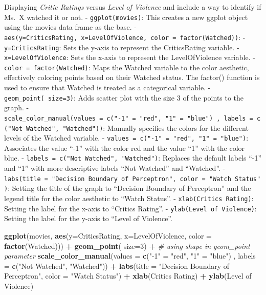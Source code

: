 \documentclass[
]{article}
\newenvironment{Shaded}{\begin{snugshade}}{\end{snugshade}}
\newcommand{\AttributeTok}[1]{\textcolor[rgb]{0.13,0.29,0.53}{#1}}
\newcommand{\CommentTok}[1]{\textcolor[rgb]{0.56,0.35,0.01}{\textit{#1}}}
\newcommand{\DecValTok}[1]{\textcolor[rgb]{0.00,0.00,0.81}{#1}}
\newcommand{\FunctionTok}[1]{\textcolor[rgb]{0.13,0.29,0.53}{\textbf{#1}}}
\newcommand{\NormalTok}[1]{#1}
\newcommand{\OtherTok}[1]{\textcolor[rgb]{0.56,0.35,0.01}{#1}}
\newcommand{\SpecialCharTok}[1]{\textcolor[rgb]{0.81,0.36,0.00}{\textbf{#1}}}
\newcommand{\StringTok}[1]{\textcolor[rgb]{0.31,0.60,0.02}{#1}}
\begin{document}
Displaying \emph{Critic Ratings} versus \emph{Level of Violence} and
include a way to identify if Ms.~X watched it or not. -
\texttt{ggplot(movies)}: This creates a new ggplot object using the
movies data frame as the base. -
\texttt{aes(y=CriticsRating,\ x=LevelOfViolence,\ color\ =\ factor(Watched))}:
- \texttt{y=CriticsRating}: Sets the y-axis to represent the
CriticsRating variable. - \texttt{x=LevelOfViolence}: Sets the x-axis to
represent the LevelOfViolence variable. -
\texttt{color\ =\ factor(Watched)}: Maps the Watched variable to the
color aesthetic, effectively coloring points based on their Watched
status. The factor() function is used to ensure that Watched is treated
as a categorical variable. - \texttt{geom\_point(\ size=3)}: Adds
scatter plot with the size 3 of the points to the graph. -
\texttt{scale\_color\_manual(values\ =\ c("-1"\ =\ "red",\ "1"\ =\ "blue")\ ,\ labels\ =\ c("Not\ Watched",\ "Watched"))}:
Manually specifies the colors for the different levels of the Watched
variable. - \texttt{values\ =\ c("-1"\ =\ "red",\ "1"\ =\ "blue")}:
Associates the value ``-1'' with the color red and the value ``1'' with
the color blue. - \texttt{labels\ =\ c("Not\ Watched",\ "Watched")}:
Replaces the default labels ``-1'' and ``1'' with more descriptive
labels ``Not Watched'' and ``Watched''. -
\texttt{labs(title\ =\ "Decision\ Boundary\ of\ Perceptron",\ color\ =\ "Watch\ Status")}:
Setting the title of the graph to ``Decision Boundary of Perceptron''
and the legend title for the color aesthetic to ``Watch Status''. -
\texttt{xlab(\textquotesingle{}Critics\ Rating\textquotesingle{})}:
Setting the label for the x-axis to ``Critics Rating''. -
\texttt{ylab(\textquotesingle{}Level\ of\ Violence\textquotesingle{})}:
Setting the label for the y-axis to ``Level of Violence''.

\begin{Shaded}
\begin{Highlighting}[]
\FunctionTok{ggplot}\NormalTok{(movies, }\FunctionTok{aes}\NormalTok{(}\AttributeTok{y=}\NormalTok{CriticsRating, }\AttributeTok{x=}\NormalTok{LevelOfViolence, }\AttributeTok{color =} \FunctionTok{factor}\NormalTok{(Watched))) }\SpecialCharTok{+}
  \FunctionTok{geom\_point}\NormalTok{( }\AttributeTok{size=}\DecValTok{3}\NormalTok{) }\SpecialCharTok{+} \CommentTok{\# using shape in geom\_point parameter}
  \FunctionTok{scale\_color\_manual}\NormalTok{(}\AttributeTok{values =} \FunctionTok{c}\NormalTok{(}\StringTok{"{-}1"} \OtherTok{=} \StringTok{"red"}\NormalTok{, }\StringTok{"1"} \OtherTok{=} \StringTok{"blue"}\NormalTok{) , }\AttributeTok{labels =} \FunctionTok{c}\NormalTok{(}\StringTok{"Not Watched"}\NormalTok{, }\StringTok{"Watched"}\NormalTok{)) }\SpecialCharTok{+}
  \FunctionTok{labs}\NormalTok{(}\AttributeTok{title =} \StringTok{"Decision Boundary of Perceptron"}\NormalTok{, }\AttributeTok{color =} \StringTok{"Watch Status"}\NormalTok{) }\SpecialCharTok{+}
  \FunctionTok{xlab}\NormalTok{(}\StringTok{\textquotesingle{}Critics Rating\textquotesingle{}}\NormalTok{) }\SpecialCharTok{+}
  \FunctionTok{ylab}\NormalTok{(}\StringTok{\textquotesingle{}Level of Violence\textquotesingle{}}\NormalTok{)}
\end{Highlighting}
\end{Shaded}
\end{document}
